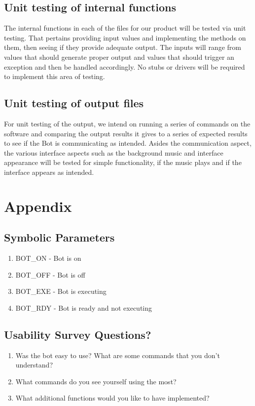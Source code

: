 \documentclass[12pt, titlepage]{article}
\begin{document}
\subsection{Unit testing of internal functions}

The internal functions in each of the files for our product will be tested via unit testing. That pertains providing input values and implementing the methods on them, then seeing if they provide adequate output. The inputs will range from values that should generate proper output and values that should trigger an exception and then be handled accordingly. No stubs or drivers will be required to implement this area of testing.
		
\subsection{Unit testing of output files}		

For unit testing of the output, we intend on running a series of commands on the software and comparing the output results it gives to a series of expected results to see if the Bot is communicating as intended. Asides the communication aspect, the various interface aspects such as the background music and interface appearance will be tested for simple functionality, if the music plays and if the interface appears as intended.

\iffalse




\fi

\newpage

\section{Appendix}


\subsection{Symbolic Parameters}
\begin{enumerate}
\item BOT\_ON - Bot is on
\item BOT\_OFF - Bot is off
\item BOT\_EXE - Bot is executing
\item BOT\_RDY - Bot is ready and not executing

\end{enumerate}

\subsection{Usability Survey Questions?}

\begin{enumerate}
\item Was the bot easy to use? What are some commands that you don't understand?

\item What commands do you see yourself using the most?

\item What additional functions would you like to have implemented?
\end{enumerate}	
\end{document}

